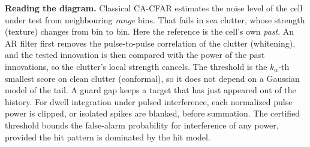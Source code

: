 \documentclass[10pt]{article}
\begin{document}
\begin{center}
\end{center}

\medskip
\noindent\small\textbf{Reading the diagram.} Classical CA-CFAR estimates the noise level of the cell under test from neighbouring \emph{range} bins. That fails in sea clutter, whose strength (texture) changes from bin to bin. Here the reference is the cell's own \emph{past}. An AR filter first removes the pulse-to-pulse correlation of the clutter (whitening), and the tested innovation is then compared with the power of the past innovations, so the clutter's local strength cancels. The threshold is the $k_\alpha$-th smallest score on clean clutter (conformal), so it does not depend on a Gaussian model of the tail. A guard gap keeps a target that has just appeared out of the history. For dwell integration under pulsed interference, each normalized pulse power is clipped, or isolated spikes are blanked, before summation. The certified threshold bounds the false-alarm probability for interference of any power, provided the hit pattern is dominated by the hit model.
\end{document}
